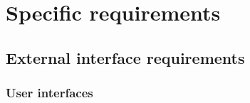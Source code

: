 \section{Specific requirements}
\subsection{External interface requirements}
\subsubsection{User interfaces}


